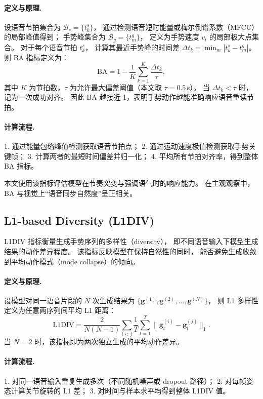 \paragraph{定义与原理.}
设语音节拍集合为 $\mathcal{B}_s = \{t^s_k\}$，
通过检测语音短时能量或梅尔倒谱系数（MFCC）的局部峰值得到；
手势峰集合为 $\mathcal{B}_g = \{t^g_m\}$，
定义为手势速度 $v_t$ 的局部极大点集合。
对于每个语音节拍 $t^s_k$，
计算其最近手势峰的时间差 $\Delta t_k = \min_m |t^s_k - t^g_m|$。
则 BA 指标定义为：
\begin{equation}
\mathrm{BA} = 1 - \frac{1}{K} \sum_{k=1}^{K} \frac{\Delta t_k}{\tau},
\end{equation}
其中 $K$ 为节拍数，$\tau$ 为允许最大偏差阈值（本文取 $\tau=0.5$\,s）。
当 $\Delta t_k < \tau$ 时，记为一次成功对齐。
因此 $\mathrm{BA}$ 越接近 1，表明手势动作越能准确响应语音重读节拍。

\paragraph{计算流程.}
1. 通过能量包络峰值检测获取语音节拍点；  
2. 通过运动速度极值检测获取手势关键帧；  
3. 计算两者的最短时间偏差并归一化；  
4. 平均所有节拍对齐率，得到整体 BA 指标。  

本文使用该指标评估模型在节奏突变与强调语气时的响应能力。
在主观观察中，BA 与视觉上“语音同步自然度”呈正相关。

\subsection{L1-based Diversity (L1DIV)}
\label{subsec:l1div}

L1DIV 指标\cite{beatcamn}衡量生成手势序列的多样性（diversity），
即不同语音输入下模型生成结果的动作差异程度。
该指标反映模型在保持自然性的同时，
能否避免生成收敛到平均动作模式（mode collapse）的倾向。

\paragraph{定义与原理.}
设模型对同一语音片段的 $N$ 次生成结果为
$\{\bm{g}^{(1)}, \bm{g}^{(2)}, \dots, \bm{g}^{(N)}\}$，
则 L1 多样性定义为任意两序列间平均 L1 距离：
\begin{equation}
\mathrm{L1DIV} = 
\frac{2}{N(N-1)} \sum_{i<j} 
\frac{1}{T} \sum_{t=1}^{T} 
\|\bm{g}^{(i)}_t - \bm{g}^{(j)}_t\|_1.
\end{equation}
当 $N=2$ 时，该指标即为两次独立生成的平均动作差异。

\paragraph{计算流程.}
1. 对同一语音输入重复生成多次（不同随机噪声或 dropout 路径）；  
2. 对每帧姿态计算关节旋转的 L1 差；  
3. 对时间与样本求平均得到整体 L1DIV 值。  

